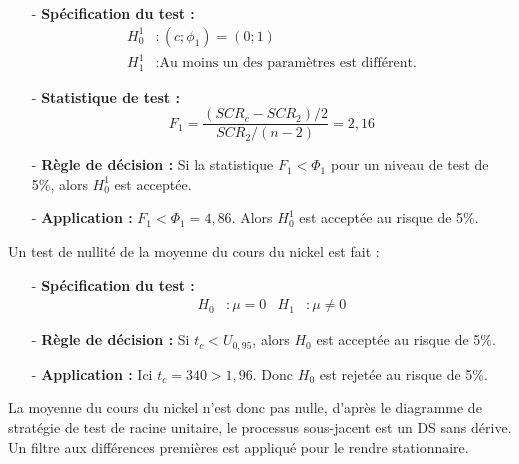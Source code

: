 \begin{itemize}
\item[-]\textbf{Spécification du test :} 
\begin{equation*}
    \begin{split}
        H_{0}^{1} &: (c; \phi_{1}) = (0;1)\\
        H_{1}^{1} &: \text{Au moins un des paramètres est différent.}
    \end{split}
\end{equation*}
\item[-]\textbf{Statistique de test :}
\begin{equation*}
    F_{1} = \frac{(SCR_{c} - SCR_{2})/2}{SCR_{2}/(n-2)} = 2,16
\end{equation*}
\item[-]\textbf{Règle de décision :}  Si la statistique $F_{1} < \Phi_{1}$ pour un niveau de test de 5\%, alors $H_{0}^{1}$ est acceptée.
\item[-]\textbf{Application :} $F_{1} < \Phi_{1} = 4,86 $. Alors $H_{0}^{1}$ est acceptée au risque de 5\%.
\end{itemize}
%
Un test de nullité de la moyenne du cours du nickel est fait :
\begin{itemize}
    \item[-]\textbf{Spécification du test :}
\begin{align*}
    H_{0} &: \mu = 0 & H_{1} &: \mu \neq 0
\end{align*}
\item[-]\textbf{Règle de décision :} Si $t_{c} < U_{0,95}$, alors $H_{0}$ est acceptée au risque de 5\%.
\item[-]\textbf{Application :} Ici $t_{c} = 340 > 1,96 $. Donc $H_{0}$ est rejetée au risque de 5\%.
\end{itemize}
La moyenne du cours du nickel n'est donc pas nulle, d'après le diagramme de stratégie de test de racine unitaire, le processus sous-jacent est un DS sans dérive. Un filtre 
aux différences premières est appliqué pour le rendre stationnaire.
